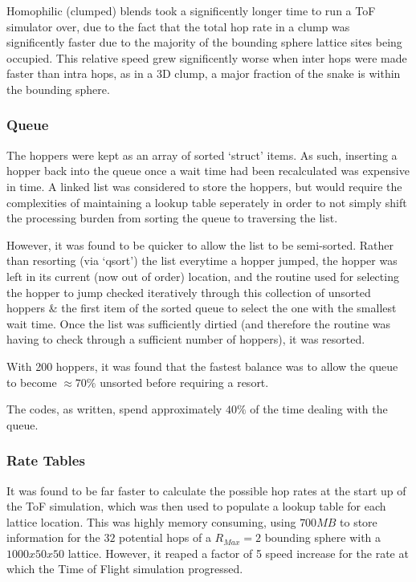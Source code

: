 \documentclass[twocolumn,a4,notitlepage]{report}
\begin{document}
Homophilic (clumped) blends took a significently longer time to run a ToF
simulator over, due to the fact that the total hop rate in a clump was
significently faster due to the majority of the bounding sphere lattice
sites being occupied. This relative speed grew significently worse when
inter hops were made faster than intra hops, as in a 3D clump, a major
fraction of the snake is within the bounding sphere.

\subsubsection{Queue}

The hoppers were kept as an array of sorted `struct' items. As such,
inserting a hopper back into the queue once a wait time had been
recalculated was expensive in time. A linked list was considered to store
the hoppers, but would require the complexities of maintaining a lookup
table seperately in order to not simply shift the processing burden from
sorting the queue to traversing the list.

However, it was found to be quicker to allow the list to be semi-sorted.
Rather than resorting (via `qsort') the list everytime a hopper jumped, the
hopper was left in its current (now out of order) location, and the routine
used for selecting the hopper to jump checked iteratively through this
collection of unsorted hoppers \& the first item of the sorted queue to
select the one with the smallest wait time. Once the list was sufficiently
dirtied (and therefore the routine was having to check through a sufficient
number of hoppers), it was resorted.

With 200 hoppers, it was found that the fastest balance was to allow the
queue to become $\approx 70\%$ unsorted before requiring a resort.

The codes, as written, spend approximately $40\%$ of the time dealing with
the queue.

\subsubsection{Rate Tables}

It was found to be far faster to calculate the possible hop rates at the
start up of the ToF simulation, which was then used to populate a lookup
table for each lattice location. This was highly memory consuming, using
$700MB$ to store information for the $32$ potential hops of a $R_{Max}=2$
bounding sphere with a $1000x50x50$ lattice. However, it reaped a factor of
5 speed increase for the rate at which the Time of Flight simulation
progressed.
\end{document}
